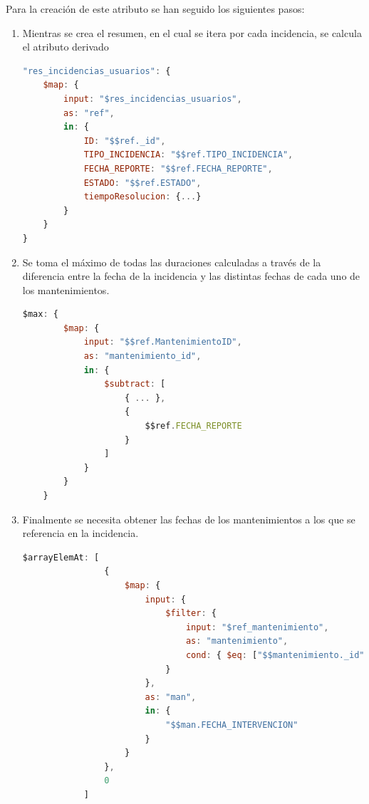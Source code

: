 \documentclass[]{article}
\begin{document}
\begin{itemize}
    Para la creación de este atributo se han seguido los siguientes pasos:
    \begin{enumerate}
        \item Mientras se crea el resumen, en el cual se itera por cada incidencia, se calcula el atributo derivado
        
        \begin{lstlisting}[caption=Iterar por cada incidencia durante la creación del resumen, language=JavaScript]
"res_incidencias_usuarios": {
    $map: {
        input: "$res_incidencias_usuarios",
        as: "ref",
        in: {
            ID: "$$ref._id",
            TIPO_INCIDENCIA: "$$ref.TIPO_INCIDENCIA",
            FECHA_REPORTE: "$$ref.FECHA_REPORTE",
            ESTADO: "$$ref.ESTADO",
            tiempoResolucion: {...}
        }
    }
}
        \end{lstlisting}

        \item Se toma el máximo de todas las duraciones calculadas a través de la diferencia entre la fecha de la incidencia y las distintas fechas de cada uno de los mantenimientos.
        
        \begin{lstlisting}[language=JavaScript, caption=Máximo de las duraciones calculadas]
$max: {
        $map: {
            input: "$$ref.MantenimientoID",
            as: "mantenimiento_id",
            in: {
                $subtract: [
                    { ... },
                    {
                        $$ref.FECHA_REPORTE
                    }
                ]
            }
        }
    }
        \end{lstlisting}

        \item Finalmente se necesita obtener las fechas de los mantenimientos a los que se referencia en la incidencia.
        
        \begin{lstlisting}[language=JavaScript, caption=Obtención de fechas de mantenimiento relacionadas con la incidencia]
$arrayElemAt: [
                {
                    $map: {
                        input: {
                            $filter: {
                                input: "$ref_mantenimiento",
                                as: "mantenimiento",
                                cond: { $eq: ["$$mantenimiento._id", "$$mantenimiento_id"] }
                            }
                        },
                        as: "man",
                        in: {
                            "$$man.FECHA_INTERVENCION"
                        }
                    }
                },
                0
            ]
        \end{lstlisting}
    \end{enumerate}
\end{itemize}
\end{document}
